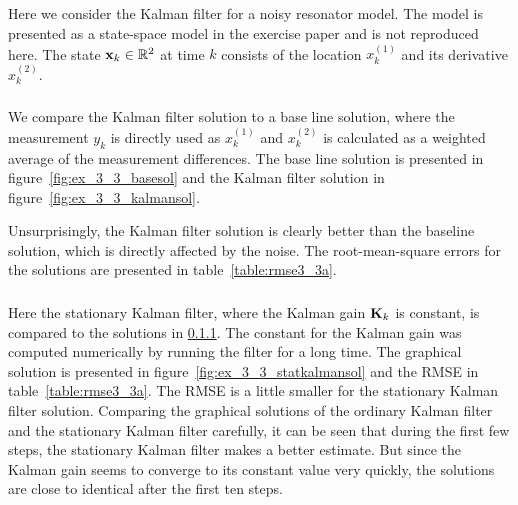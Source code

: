 \documentclass[a4paper,oneside,article]{memoir}
\begin{document}
\subsection{}\label{sec:3_3}
Here we consider the Kalman filter for a noisy resonator model. The model
is presented as a state-space model in the exercise paper and is not
reproduced here. The state $\mathbf{x}_k\in\mathbb{R}^2$ at time $k$ consists
of the location $x_k^{(1)}$ and its derivative $x_k^{(2)}$. 

\subsubsection{}\label{sec:3_3a}
We compare the Kalman filter solution to a base line solution, where the
measurement $y_k$ is directly used as $x_k^{(1)}$ and $x_k^{(2)}$ is calculated
as a weighted average of the measurement differences. The base line solution is
presented in figure~\ref{fig:ex_3_3_basesol} and the Kalman filter solution in 
figure~\ref{fig:ex_3_3_kalmansol}. 


Unsurprisingly, the Kalman filter solution is clearly better than the baseline
solution, which is directly affected by the noise. The root-mean-square errors
for the solutions are presented in table~\ref{table:rmse3_3a}.


\subsubsection{\label{sec:3_3b}}

Here the stationary Kalman filter, where the Kalman gain $\mathbf{K}_k$ is constant,
is compared to the solutions in \ref{sec:3_3a}. The constant for the Kalman gain
was computed numerically by running the filter for a long time. The graphical
solution is presented in figure~\ref{fig:ex_3_3_statkalmansol} and the RMSE in
table~\ref{table:rmse3_3a}. The RMSE is a little smaller for the stationary
Kalman filter solution. Comparing the graphical solutions of the
ordinary Kalman filter and the stationary Kalman filter carefully, it can be
seen that during the first few steps, the stationary Kalman filter makes a
better estimate. But since the Kalman gain seems to converge to its constant
value very quickly, the solutions are close to identical after the first ten
steps.
\end{document}
